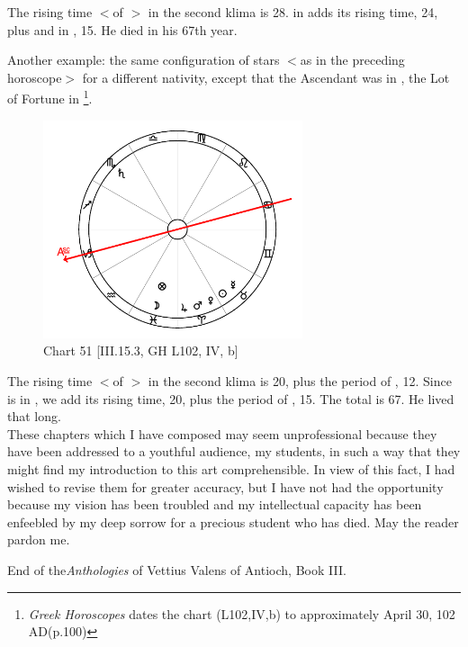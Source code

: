 The rising time $<$of \Gemini$>$ in the second klima is 28. \Mercury\xspace in \Taurus\xspace adds its rising time, 24, plus \Mars\xspace and \Venus\xspace in \Aries, 15. He died in his 67th year.

\newpage
Another example: the same configuration of stars $<$as in the preceding horoscope$>$ for a different nativity, except that the Ascendant was in \Capricorn, the Lot of Fortune in \Pisces
\footnote{\textit{Greek Horoscopes} dates the chart (L102,IV,b) to approximately April 30, 102 AD(p.100)}.

\clearpage
\begin{figure}
\centering
\vspace{-20pt}
\includegraphics[width=0.68\textwidth]{charts/3_15_3}
\caption{Chart 51 [III.15.3, GH L102, IV, b]}
\label{fig:chart51}
\end{figure} 

The rising time $<$of \Pisces$>$ in the second klima is 20, plus the period of \Jupiter, 12. Since \Jupiter is in \Aries, we add its rising time, 20, plus the period of \Mars, 15. The total is 67. He lived that long. \\
\newline
\newline
These chapters which I have composed may seem unprofessional because they have been addressed to a youthful audience, my students, in such a way that they might find my introduction to this art comprehensible. In view of this fact, I had wished to revise them for greater accuracy, but I have not had the opportunity because my vision has been troubled and my intellectual capacity has been enfeebled by my deep sorrow for a precious student who has died. May the reader pardon me.

End of the\textit{Anthologies} of Vettius Valens of Antioch, Book III.

\newpage